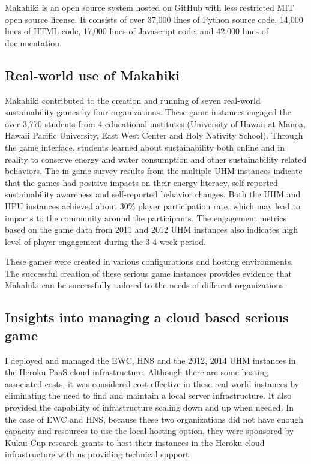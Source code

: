 Makahiki is an open source system hosted on GitHub \cite{makahiki2} with less restricted MIT open source license. It  consists of over 37,000 lines of Python source code, 14,000 lines of HTML code,  17,000 lines of Javascript code, and 42,000 lines of documentation. 

\subsection{Real-world use of Makahiki}

Makahiki contributed to the creation and running of seven real-world sustainability games by four  organizations. These game instances engaged the over 3,770 students from 4 educational institutes (University of Hawaii at Manoa, Hawaii Pacific University, East West Center and Holy Nativity School). Through the game interface, students learned about sustainability both online and in reality to conserve energy and water consumption and other sustainability related behaviors. The in-game survey results from the multiple UHM instances indicate that the games had positive impacts on their energy literacy, self-reported sustainability awareness and self-reported behavior changes. Both the UHM and HPU instances achieved about 30\% player participation rate, which may lead to impacts to the community around the participants. The engagement metrics based on the game data from 2011 and 2012 UHM instances also indicates high level of player engagement during the 3-4 week period.

These games were created in various configurations and hosting environments. The successful creation of these serious game instances provides evidence that Makahiki can be successfully tailored to the needs of different organizations.


\subsection{Insights into managing a cloud based serious game}

I deployed and managed the EWC, HNS and the 2012, 2014 UHM instances in the Heroku PaaS cloud infrastructure. Although there are some hosting associated costs, it was considered cost effective in these real world instances by eliminating the need to find and maintain a local server infrastructure. It also provided the capability of infrastructure scaling down and up when needed. In the case of EWC and HNS, because these two organizations did not have enough capacity and resources to use the local hosting option, they were sponsored by Kukui Cup research grants to host their instances in the Heroku cloud infrastructure with us providing technical support. 

